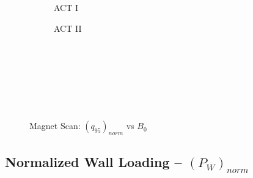 \begin{figure*}[h!]
\begin{subfigure}[t]{0.45\textwidth}
    \begin{adjustbox}{width=\textwidth}
      \Large
      
    \end{adjustbox}
        \caption{ACT I}
    \end{subfigure}
    \hfill
    \begin{subfigure}[t]{0.45\textwidth}
        \centering
    \begin{adjustbox}{width=\textwidth}
      \Large
      
    \end{adjustbox}
        \caption{ACT II}
    \end{subfigure}
    \hfill \hfill ~\\ ~\\ ~\\ ~\\
  \caption[]{Magnet Scan: $(q_{95})_{norm}$ vs $B_0$} ~\\
\end{figure*}


\clearpage

\newpage

\subsection*{ Normalized Wall Loading  -- $(P_W)_{norm}$ }
  \label{subsection:scan_norm_P_W}

